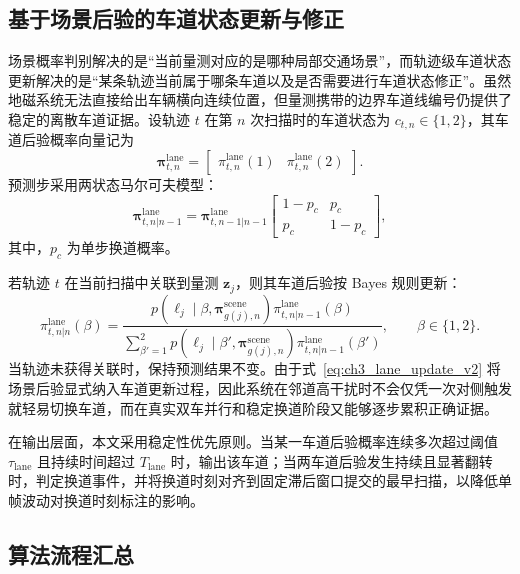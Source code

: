 \documentclass{xdupgthesis}
\begin{document}
\subsection{基于场景后验的车道状态更新与修正}

场景概率判别解决的是“当前量测对应的是哪种局部交通场景”，而轨迹级车道状态更新解决的是“某条轨迹当前属于哪条车道以及是否需要进行车道状态修正”。虽然地磁系统无法直接给出车辆横向连续位置，但量测携带的边界车道线编号仍提供了稳定的离散车道证据。设轨迹 $t$ 在第 $n$ 次扫描时的车道状态为 $c_{t,n}\in\{1,2\}$，其车道后验概率向量记为
\begin{equation}
	\boldsymbol\pi_{t,n}^{\mathrm{lane}}=
	\begin{bmatrix}
		\pi_{t,n}^{\mathrm{lane}}(1) &
		\pi_{t,n}^{\mathrm{lane}}(2)
	\end{bmatrix}.
	\label{eq:ch3_lane_vector_v2}
\end{equation}
预测步采用两状态马尔可夫模型：
\begin{equation}
	\boldsymbol\pi_{t,n|n-1}^{\mathrm{lane}}
	=
	\boldsymbol\pi_{t,n-1|n-1}^{\mathrm{lane}}
	\begin{bmatrix}
		1-p_c & p_c\\
		p_c & 1-p_c
	\end{bmatrix},
	\label{eq:ch3_lane_predict_v2}
\end{equation}
其中，$p_c$ 为单步换道概率。

若轨迹 $t$ 在当前扫描中关联到量测 $\mathbf z_j$，则其车道后验按 Bayes 规则更新：
\begin{equation}
	\pi_{t,n|n}^{\mathrm{lane}}(\beta)
	=
	\frac{p(\ell_j\mid \beta,\boldsymbol\pi_{g(j),n}^{\mathrm{scene}})\pi_{t,n|n-1}^{\mathrm{lane}}(\beta)}{\sum\limits_{\beta'=1}^{2}p(\ell_j\mid \beta',\boldsymbol\pi_{g(j),n}^{\mathrm{scene}})\pi_{t,n|n-1}^{\mathrm{lane}}(\beta')},
	\qquad \beta\in\{1,2\}.
	\label{eq:ch3_lane_update_v2}
\end{equation}
当轨迹未获得关联时，保持预测结果不变。由于式~\eqref{eq:ch3_lane_update_v2} 将场景后验显式纳入车道更新过程，因此系统在邻道高干扰时不会仅凭一次对侧触发就轻易切换车道，而在真实双车并行和稳定换道阶段又能够逐步累积正确证据。

在输出层面，本文采用稳定性优先原则。当某一车道后验概率连续多次超过阈值 $\tau_{\mathrm{lane}}$ 且持续时间超过 $T_{\mathrm{lane}}$ 时，输出该车道；当两车道后验发生持续且显著翻转时，判定换道事件，并将换道时刻对齐到固定滞后窗口提交的最早扫描，以降低单帧波动对换道时刻标注的影响。

\subsection{算法流程汇总}
\end{document}
